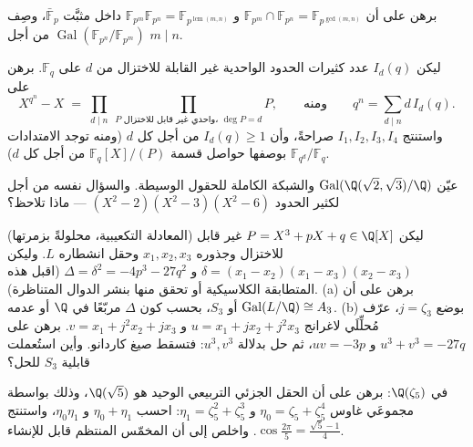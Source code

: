 \begin{exercise}[$\star\star$]\label{exo:b3:galois:5}
برهن على أن $\mathbb F_{p^m} \cap \mathbb F_{p^n} = \mathbb
F_{p^{\gcd(m,n)}}$ و $\mathbb F_{p^m}\mathbb F_{p^n} = \mathbb
F_{p^{\operatorname{lcm}(m,n)}}$ داخل  مثبَّت $\bar{\mathbb F}_p$،
وصِف $\operatorname{Gal}(\mathbb F_{p^n}/\mathbb F_{p^m})$ من أجل $m
\mid n$.
\end{exercise}

\begin{exercise}[$\star\star$]\label{exo:b3:galois:6}
ليكن $I_d(q)$ عدد كثيرات الحدود الواحدية غير القابلة للاختزال من
 $d$ على $\mathbb F_q$. برهن على
\[
X^{q^n} - X \;=\; \prod_{d \mid n}\ \prod_{P \text{ واحدي غير قابل للاختزال، } \deg P = d} P ,
\qquad\text{ومنه}\qquad
q^n = \sum_{d \mid n} d\, I_d(q).
\]
واستنتج $I_1, I_2, I_3, I_4$ صراحةً، وأن $I_d(q) \geq 1$ من أجل كل $d$ (ومنه
توجد الامتدادات $\mathbb F_{q^d}/\mathbb F_q$ بوصفها حواصل قسمة $\mathbb F_q[X]/(P)$ من أجل كل
$d$).
\end{exercise}

\begin{exercise}[$\star\star$]\label{exo:b3:galois:7}
عيّن $\operatorname{Gal}(\Q(\sqrt2,\sqrt3)/\Q)$ والشبكة الكاملة للحقول الوسيطة. والسؤال نفسه من أجل
 لكثير الحدود $(X^2-2)(X^2-3)(X^2-6)$ --- ماذا تلاحظ؟
\end{exercise}

\begin{exercise}[$\star\star$]\label{exo:b3:galois:8}
(المعادلة التكعيبية، محلولةً بزمرتها) ليكن $P = X^3 + pX + q \in
\Q[X]$ غير قابل
للاختزال وجذوره $x_1, x_2, x_3$ وحقل انشطاره $L$. وليكن $\delta = (x_1 - x_2)(x_1 - x_3)(x_2 - x_3)$
و $\Delta = \delta^2 = -4p^3 - 27q^2$ (اقبل هذه المتطابقة الكلاسيكية أو تحقق منها بنشر
الدوال المتناظرة).
(a) برهن على أن $\operatorname{Gal}(L/\Q) \cong A_3$ أو $S_3$، بحسب كون $\Delta$ مربّعًا في
$\Q$ أو عدمه.
(b) بوضع $j = \zeta_3$، عرّف مُحلِّلَي لاغرانج $u = x_1
+ jx_2 + j^2x_3$ و $v = x_1 + j^2x_2 + jx_3$.
برهن على $u^3 + v^3
= -27q$ و $uv = -3p$، ثم حل بدلالة $u^3, v^3$: فتسقط
صيغ كاردانو. وأين استُعملت قابلية $S_3$ للحل؟
\end{exercise}

\begin{exercise}[$\star\star$]\label{exo:b3:galois:9}
في $\Q(\zeta_5)$: برهن على أن الحقل الجزئي التربيعي الوحيد هو
$\Q(\sqrt5)$، وذلك بواسطة مجموعَي غاوس $\eta_0 = \zeta_5 + \zeta_5^4$ و $\eta_1 = \zeta_5^2 + \zeta_5^3$: احسب
$\eta_0 + \eta_1$ و $\eta_0\eta_1$، واستنتج $\cos\frac{2\pi}5 = \frac{\sqrt5 -
1}4$. واخلص إلى أن المخمّس
المنتظم قابل للإنشاء.
\end{exercise}

